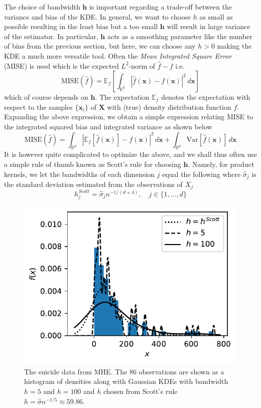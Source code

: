 \documentclass[../Thesis.tex]{subfiles}
\begin{document}
The choice of bandwidth $\boldsymbol h$ is important regarding a trade-off between the variance and bias of the KDE. In general, we want to choose $h$ as small as possible resulting in the least bias but a too small $\boldsymbol h$ will result in large variance of the estimator. In particular, $\boldsymbol h$ acts as a smoothing parameter like the number of bins from the previous section, but here, we can choose any $h > 0$ making the KDE a much more versatile tool. Often the \textit{Mean Integrated Square Error} (MISE) is used which is the expected $L^2$-norm of $\hat{f} - f$ i.e.
$$\text{MISE} \left(\hat{f}\right) = \mathbb{E}_{f} \left[\int_{\mathbb{R}^d} \left| \hat{f}\left(\boldsymbol x\right) - f\left(\boldsymbol x\right)\right|^2 \, d\boldsymbol x\right] $$
which of course depends on $\boldsymbol h$. The expectation $\mathbb{E}_f$ denotes the expectation with respect to the samples $\{\boldsymbol x_i\}$ of $\boldsymbol X$ with (true) density distribution function $f$. Expanding the above expression, we obtain a simple expression relating MISE to the integrated squared bias and integrated variance as shown below
$$\text{MISE} \left(\hat{f}\right) =  \int_{\mathbb{R}^d} \left| \mathbb{E}_{f}\left[\hat{f}\left(\boldsymbol x\right)\right] - f\left(\boldsymbol x\right)\right|^2 \, d\boldsymbol x  +  \int_{\mathbb{R}^d} \text{Var} \left[ \hat{f}\left(\boldsymbol x\right)\right] \, d\boldsymbol x$$
It is however quite complicated to optimize the above, and we shall thus often use a simple rule of thumb known as Scott's rule \cite{Scott1992MultivariateDE} for choosing $\boldsymbol h$. Namely, for product kernels, we let the bandwidths of each dimension $j$ equal the following where $\hat{\sigma}_j$ is the standard deviation estimated from the observations of $X_j$
$$h_{j}^{Scott} = \hat{\sigma}_j n^{-1/(d+4)}, \quad j \in \{1,\dots, d\}$$

\begin{figure}[ht]
    \centering
    \includegraphics[width = .6\linewidth]{figures/MI estimation/suicide data example.pdf}
    \caption{The suicide data from MHE. The $86$ observations are shown as a histogram of densities along with Gaussian KDEs with bandwidth $h=5$ and $h=100$ and $h$ chosen from Scott's rule $h = \hat{\sigma} n^{-1/5} \approx 59.86$.}
    \label{fig:suicide KDE example}
\end{figure}
\end{document}
